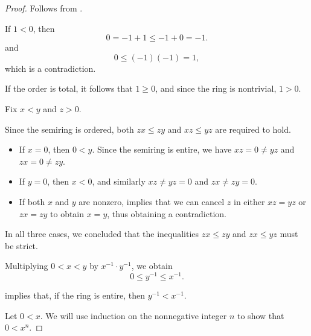 \begin{proof}
   Follows from .

   If \( 1 < 0 \), then
  \begin{equation*}
    0 = -1 + 1 \leq -1 + 0 = -1.
  \end{equation*}
  and
  \begin{equation*}
    0 \leq (-1)(-1) = 1,
  \end{equation*}
  which is a contradiction.

  If the order is total, it follows that \( 1 \geq 0 \), and since the ring is nontrivial, \( 1 > 0 \).

   Fix \( x < y \) and \( z > 0 \).

  Since the semiring is ordered, both \( zx \leq zy \) and \( xz \leq yz \) are required to hold.

  \begin{itemize}
    \item If \( x = 0 \), then \( 0 < y \). Since the semiring is entire, we have \( xz = 0 \neq yz \) and \( zx = 0 \neq zy \).

    \item If \( y = 0 \), then \( x < 0 \), and similarly \( xz \neq yz = 0 \) and \( zx \neq zy = 0 \).

    \item If both \( x \) and \( y \) are nonzero,  implies that we can cancel \( z \) in either \( xz = yz \) or \( zx = zy \) to obtain \( x = y \), thus obtaining a contradiction.
  \end{itemize}

  In all three cases, we concluded that the inequalities \( zx \leq zy \) and \( zx \leq yz \) must be strict.

   Multiplying \( 0 < x < y \) by \( x^{-1} \cdot y^{-1} \), we obtain
  \begin{equation*}
    0 \leq y^{-1} \leq x^{-1}.
  \end{equation*}

   implies that, if the ring is entire, then \( y^{-1} < x^{-1} \).

   Let \( 0 < x \). We will use induction on the nonnegative integer \( n \) to show that \( 0 < x^n \).


\end{proof}
